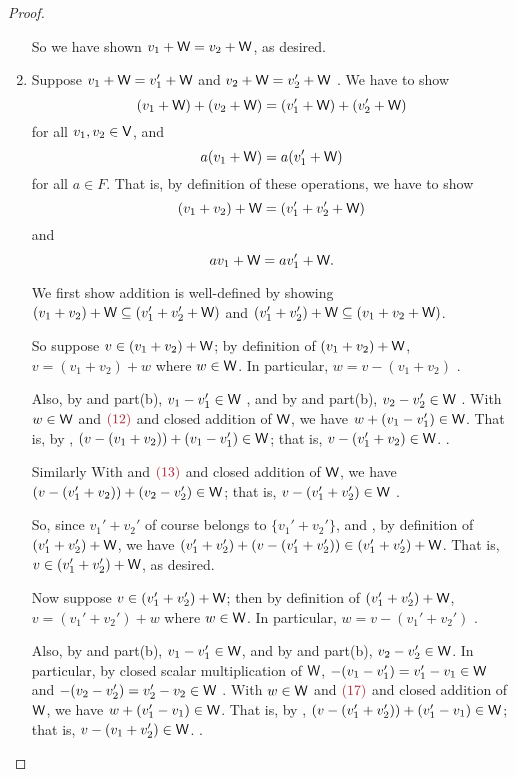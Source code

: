 \begin{proof}
\begin{enumerate}
So we have shown \(v_1 + \textsf{W} = v_2 + \textsf{W}\), as desired.

\item
Suppose \(v_1 + \textsf{W} = v_1' + \textsf{W}\)  and \(v_2 + \textsf{W} = v_2' + \textsf{W}\) .
We have to show
\[
    (v_1 + \textsf{W}) + (v_2 + \textsf{W}) = (v_1' + \textsf{W}) + (v_2' + \textsf{W})
\]
for all \(v_1, v_2 \in \textsf{V}\), and
\[
    a(v_1 + \textsf{W}) = a(v_1' + \textsf{W})
\]
for all \(a \in F\).
That is, by definition of these operations, we have to show
\[
    (v_1 + v_2) + \textsf{W} = (v_1' + v_2' + \textsf{W})
\]
and
\[
    av_1 + \textsf{W} = av_1' + \textsf{W}.
\]

We first show addition is well-defined by showing \((v_1 + v_2) + \textsf{W} \subseteq (v_1' + v_2' + \textsf{W})\) and \((v_1' + v_2') + \textsf{W} \subseteq (v_1 + v_2 + \textsf{W})\).

So suppose \(v \in (v_1 + v_2) + \textsf{W}\);
by definition of \((v_1 + v_2) + \textsf{W}\), \(v = (v_1 + v_2) + w\) where \(w \in \textsf{W}\).
In particular, \(w = v - (v_1 + v_2)\) .

Also, by  and part(b), \(v_1 - v_1' \in \textsf{W}\) , and by  and part(b), \(v_2 - v_2' \in \textsf{W}\) .
With \(w \in \textsf{W}\) and \(\MAROON{(12)}\) and closed addition of \(\textsf{W}\), we have \(w + (v_1 - v_1') \in \textsf{W}\).
That is, by , \((v - (v_1 + v_2)) + (v_1 - v_1') \in \textsf{W}\);
that is, \(v - (v_1' + v_2) \in \textsf{W}\). .

Similarly With  and \(\MAROON{(13)}\) and closed addition of \(\textsf{W}\), we have \((v - (v_1' + v_2)) + (v_2 - v_2') \in \textsf{W}\);
that is, \(v - (v_1' + v_2') \in \textsf{W}\) .

So, since \(v_1' + v_2'\) of course belongs to \(\{ v_1' + v_2' \}\), and , by definition of \((v_1' + v_2') + \textsf{W}\), we have \((v_1' + v_2') + (v - (v_1' + v_2')) \in (v_1' + v_2') + \textsf{W}\).
That is, \(v \in (v_1' + v_2') + \textsf{W}\), as desired.

Now suppose \(v \in (v_1' + v_2') + \textsf{W}\);
then by definition of \((v_1' + v_2') + \textsf{W}\), \(v = (v_1' + v_2') + w\) where \(w \in \textsf{W}\).
In particular, \(w = v - (v_1' + v_2')\) .

Also, by  and part(b), \(v_1 - v_1' \in \textsf{W}\), and by  and part(b), \(v_2 - v_2' \in \textsf{W}\).
In particular, by closed scalar multiplication of \(\textsf{W}\), \(-(v_1 - v_1') = v_1' - v_1 \in \textsf{W}\)  and \(-(v_2 - v_2') = v_2' - v_2 \in \textsf{W}\) .
With \(w \in \textsf{W}\) and \(\MAROON{(17)}\) and closed addition of \(\textsf{W}\), we have \(w + (v_1' - v_1) \in \textsf{W}\).
That is, by , \((v - (v_1' + v_2')) + (v_1' - v_1) \in \textsf{W}\);
that is, \(v - (v_1 + v_2') \in \textsf{W}\). .


\end{enumerate}
\end{proof}
